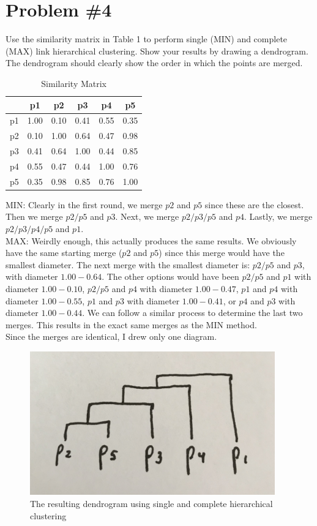 \documentclass[12pt]{article}
\begin{document}
	\section*{Problem \#4}
	Use the similarity matrix in Table 1 to perform single
	(MIN) and complete (MAX) link hierarchical clustering. Show your results by drawing a
	dendrogram. The dendrogram should clearly show the order in which the points are merged.
	\begin{table}[H]
		\centering
		\caption{Similarity Matrix}
		\begin{tabular}{c|c|c|c|c|c}
			& \textbf{p1} & \textbf{p2} & \textbf{p3} & \textbf{p4} & \textbf{p5} \\
			\hline
			p1 & 1.00 & 0.10 & 0.41 & 0.55 & 0.35 \\
			p2 & 0.10 & 1.00 & 0.64 & 0.47 & 0.98 \\
			p3 & 0.41 & 0.64 & 1.00 & 0.44 & 0.85 \\
			p4 & 0.55 & 0.47 & 0.44 & 1.00 & 0.76 \\
			p5 & 0.35 & 0.98 & 0.85 & 0.76 & 1.00 \\
			\hline
		\end{tabular}
	\end{table}
	MIN: Clearly in the first round, we merge $p2$ and $p5$ since these are the closest. Then we merge $p2/p5$ and $p3$. Next, we merge $p2/p3/p5$ and $p4$. Lastly, we merge $p2/p3/p4/p5$ and $p1$.
	\\
	MAX: Weirdly enough, this actually produces the same results. We obviously have the same starting merge ($p2$ and $p5$) since this merge would have the smallest diameter. The next merge with the smallest diameter is: $p2/p5$ and $p3$, with diameter $1.00-0.64$. The other options would have been $p2/p5$ and $p1$ with diameter $1.00-0.10$, $p2/p5$ and $p4$ with diameter $1.00-0.47$, $p1$ and $p4$ with diameter $1.00-0.55$, $p1$ and $p3$ with diameter $1.00-0.41$, or $p4$ and $p3$ with diameter $1.00-0.44$. We can follow a similar process to determine the last two merges. This results in the exact same merges as the MIN method.
	\\
	Since the merges are identical, I drew only one diagram.
	\begin{figure}[H]
		\begin{center}
			\includegraphics[width=300pt]{dendrogram.jpg}
			\caption{The resulting dendrogram using single and complete hierarchical clustering}
			\label{fig:dendro}
		\end{center}
	\end{figure}
\end{document}
